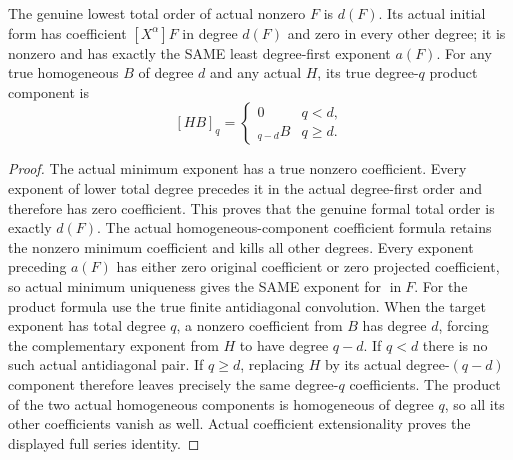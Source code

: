 \begin{lemma}
\label{hir:actual-homogeneous-initial-form-coefficients}
The genuine lowest total order of actual nonzero $F$ is $d(F)$.
Its actual initial form has coefficient $[X^\alpha]F$ in degree $d(F)$
and zero in every other degree; it is nonzero and has exactly the SAME
least degree-first exponent $a(F)$.
For any true homogeneous $B$ of degree $d$ and any actual $H$, its
true degree-$q$ product component is
\[
 [HB]_q=\begin{cases}0&q<d,\\[H]_{q-d}B&q\ge d.\end{cases}
\]
\leanok
\end{lemma}
\begin{proof}
The actual minimum exponent has a true nonzero coefficient. Every
exponent of lower total degree precedes it in the actual degree-first
order and therefore has zero coefficient. This proves that the genuine
formal total order is exactly $d(F)$. The actual homogeneous-component
coefficient formula retains the nonzero minimum coefficient and kills
all other degrees. Every exponent preceding $a(F)$ has either zero
original coefficient or zero projected coefficient, so actual minimum
uniqueness gives the SAME exponent for $\operatorname{in}F$.
For the product formula use the true finite antidiagonal convolution.
When the target exponent has total degree $q$, a nonzero coefficient
from $B$ has degree $d$, forcing the complementary exponent from $H$
to have degree $q-d$. If $q<d$ there is no such actual antidiagonal
pair. If $q\ge d$, replacing $H$ by its actual degree-$(q-d)$
component therefore leaves precisely the same degree-$q$ coefficients.
The product of the two actual homogeneous components is homogeneous
of degree $q$, so all its other coefficients vanish as well. Actual
coefficient extensionality proves the displayed full series identity.
\end{proof}

